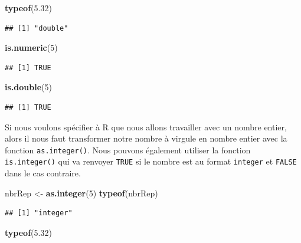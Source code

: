 \documentclass[]{book}
\newenvironment{Shaded}{\begin{snugshade}}{\end{snugshade}}
\newcommand{\DecValTok}[1]{\textcolor[rgb]{0.00,0.00,0.81}{#1}}
\newcommand{\FloatTok}[1]{\textcolor[rgb]{0.00,0.00,0.81}{#1}}
\newcommand{\KeywordTok}[1]{\textcolor[rgb]{0.13,0.29,0.53}{\textbf{#1}}}
\newcommand{\NormalTok}[1]{#1}
\newcommand{\StringTok}[1]{\textcolor[rgb]{0.31,0.60,0.02}{#1}}
\begin{document}
\begin{Shaded}
\begin{Highlighting}[]
\KeywordTok{typeof}\NormalTok{(}\FloatTok{5.32}\NormalTok{)}
\end{Highlighting}
\end{Shaded}

\begin{verbatim}
## [1] "double"
\end{verbatim}

\begin{Shaded}
\begin{Highlighting}[]
\KeywordTok{is.numeric}\NormalTok{(}\DecValTok{5}\NormalTok{)}
\end{Highlighting}
\end{Shaded}

\begin{verbatim}
## [1] TRUE
\end{verbatim}

\begin{Shaded}
\begin{Highlighting}[]
\KeywordTok{is.double}\NormalTok{(}\DecValTok{5}\NormalTok{)}
\end{Highlighting}
\end{Shaded}

\begin{verbatim}
## [1] TRUE
\end{verbatim}

Si nous voulons spécifier à R que nous allons travailler avec un nombre entier, alors il nous faut transformer notre nombre à virgule en nombre entier avec la fonction \texttt{as.integer()}. Nous pouvons également utiliser la fonction \texttt{is.integer()} qui va renvoyer \texttt{TRUE} si le nombre est au format \texttt{integer} et \texttt{FALSE} dans le cas contraire.

\begin{Shaded}
\begin{Highlighting}[]
\NormalTok{nbrRep <-}\StringTok{ }\KeywordTok{as.integer}\NormalTok{(}\DecValTok{5}\NormalTok{)}
\KeywordTok{typeof}\NormalTok{(nbrRep)}
\end{Highlighting}
\end{Shaded}

\begin{verbatim}
## [1] "integer"
\end{verbatim}

\begin{Shaded}
\begin{Highlighting}[]
\KeywordTok{typeof}\NormalTok{(}\FloatTok{5.32}\NormalTok{)}
\end{Highlighting}
\end{Shaded}
\end{document}
